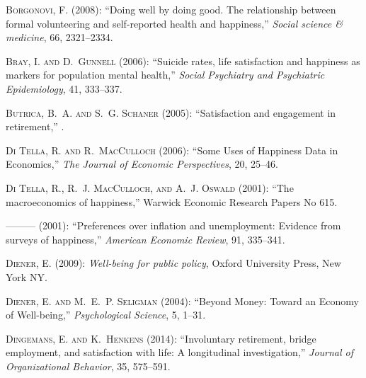 \documentclass[10pt, letterpaper]{article}
\begin{document}
\begin{spacing}{1.4}
\begin{thebibliography}{71}
\textsc{Borgonovi, F.} (2008): \enquote{Doing well by doing good. The
  relationship between formal volunteering and self-reported health and
  happiness,} \emph{Social science \& medicine}, 66, 2321--2334.

\textsc{Bray, I. and D.~Gunnell} (2006): \enquote{Suicide rates, life
  satisfaction and happiness as markers for population mental health,}
  \emph{Social Psychiatry and Psychiatric Epidemiology}, 41, 333--337.

\textsc{Butrica, B.~A. and S.~G. Schaner} (2005): \enquote{Satisfaction and
  engagement in retirement,} .

\textsc{{Di Tella}, R. and R.~MacCulloch} (2006): \enquote{Some Uses of
  Happiness Data in Economics,} \emph{The Journal of Economic Perspectives},
  20, 25--46.

\textsc{{Di Tella}, R., R.~J. MacCulloch, and A.~J. Oswald}
  (2001{}): \enquote{The macroeconomics of happiness,} Warwick
  Economic Research Papers No 615.

---\hspace{-.1pt}---\hspace{-.1pt}--- (2001{}):
  \enquote{Preferences over inflation and unemployment: Evidence from surveys
  of happiness,} \emph{American Economic Review}, 91, 335--341.

\textsc{Diener, E.} (2009): \emph{Well-being for public policy}, Oxford
  University Press, New York NY.

\textsc{Diener, E. and M.~E.~P. Seligman} (2004): \enquote{Beyond Money: Toward
  an Economy of Well-being,} \emph{Psychological Science}, 5, 1--31.

\textsc{Dingemans, E. and K.~Henkens} (2014): \enquote{Involuntary retirement,
  bridge employment, and satisfaction with life: A longitudinal investigation,}
  \emph{Journal of Organizational Behavior}, 35, 575--591.


\end{thebibliography}
\end{spacing}
\end{document}
